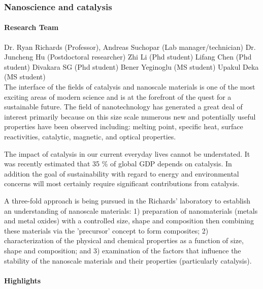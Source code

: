 \subsubsection{Nanoscience and catalysis }

\paragraph{Research Team}
Dr. Ryan Richards (Professor),
 Andreas Suchopar (Lab manager/technician)
Dr. Juncheng Hu (Postdoctoral researcher) Zhi Li (Phd student)
Lifang Chen (Phd student) Divakara SG (Phd student) Bener
Yeginoglu (MS student) Upakul Deka (MS student)
\\


The interface of the fields of catalysis and nanoscale materials
is one of the most exciting areas of modern science and is at the
forefront of the quest for a sustainable future.  The field of
nanotechnology has generated a great deal of interest primarily
because on this size scale numerous new and potentially useful
properties have been observed including: melting point, specific
heat, surface reactivities, catalytic, magnetic, and optical
properties.

The impact of catalysis in our current everyday lives cannot be
understated. It was recently estimated that 35 \% of global GDP
depends on catalysis. In addition the goal of sustainability with
regard to energy and environmental concerns will most certainly
require significant contributions from catalysis.

A three-fold approach is being pursued in the Richards' laboratory
to establish an understanding of nanoscale materials: 1)
preparation of nanomaterials (metals and metal oxides) with a
controlled size, shape and composition then combining these
materials via the 'precursor' concept to form composites; 2)
characterization of the physical and chemical properties as a
function of size, shape and composition; and 3) examination of the
factors that influence the stability of the nanoscale materials
and their properties (particularly catalysis).

\paragraph{Highlights}


